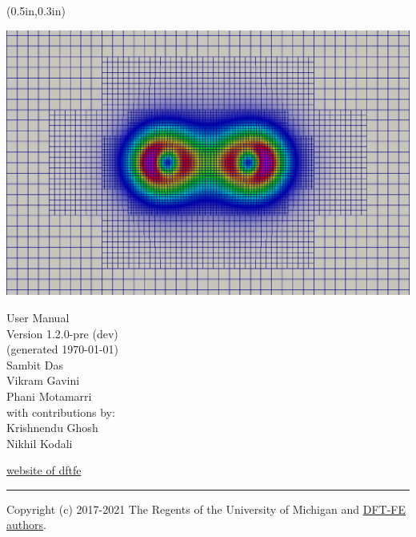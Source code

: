 \documentclass{article}
\begin{document}
{%
\begin{textblock*}{0in}(0.5in,0.3in)
\begin{center}
\vspace{1em}
\includegraphics[scale=0.35]{N2.png}
\hspace{5em}
\end{center}
\end{textblock*}

\color{dark_grey}
\vspace{1.0em}
\hfill{\Huge \fontfamily{\sfdefault}\selectfont User Manual \\
\raggedleft \huge \fontfamily{\sfdefault}\selectfont Version
1.2.0-pre (dev) %
\\\large(generated \today)\\
\vspace{1.5em}
{\Large Sambit Das\,\\Vikram Gavini\,\\Phani Motamarri\\}
\vspace{1.0em}
\large
\noindent with contributions by: \\
    {\Large Krishnendu Ghosh\\}
    {\Large Nikhil Kodali\\}
\vspace{1.0em}
}
\null
\vspace{17em}

{\noindent
{\fontfamily{\sfdefault}\selectfont \href{https://sites.google.com/umich.edu/dftfe}{website of dftfe}}
}


{\noindent
\color{dark_grey}
\rule{\textwidth}{2pt}
}

}
Copyright (c) 2017-2021 The Regents of the University of Michigan and \hyperref[sec:authors]{DFT-FE authors}.
\pagebreak
{}
\end{document}
